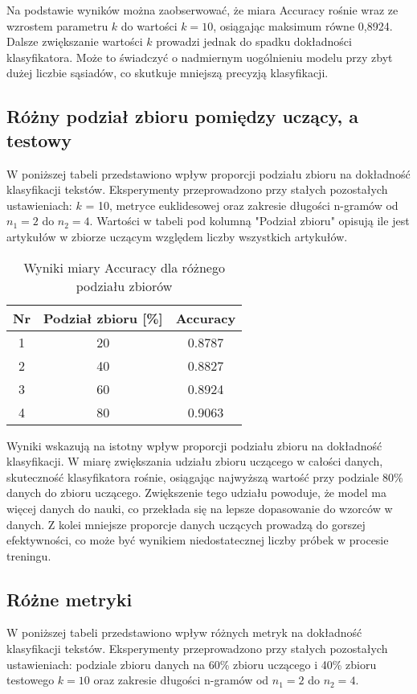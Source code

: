 \documentclass{article}
\begin{document}
Na podstawie wyników można zaobserwować, że miara Accuracy rośnie wraz ze wzrostem parametru \(k\) do wartości \(k = 10\), osiągając maksimum równe 0{,}8924. Dalsze zwiększanie wartości \(k\) prowadzi jednak do spadku dokładności klasyfikatora. Może to świadczyć o nadmiernym uogólnieniu modelu przy zbyt dużej liczbie sąsiadów, co skutkuje mniejszą precyzją klasyfikacji.

\subsection{Różny podział zbioru pomiędzy uczący, a testowy}
W poniższej tabeli przedstawiono wpływ proporcji podziału zbioru na dokładność klasyfikacji tekstów. Eksperymenty przeprowadzono przy stałych pozostałych ustawieniach: \(k\) = 10, metryce euklidesowej oraz zakresie długości n-gramów od \(n_1 = 2\) do \(n_2 = 4\). Wartości w tabeli pod kolumną "Podział zbioru" opisują ile jest artykułów w zbiorze uczącym względem liczby wszystkich artykułów.

\begin{table}[h!]
    \centering
    \begin{tabular}{|c|c|c|}
    \hline
    \textbf{Nr} & \textbf{Podział zbioru [\%]} & \textbf{Accuracy} \\ \hline
    1 & 20 & 0.8787\\ \hline
    2 & 40 & 0.8827 \\ \hline
    3 & 60 & 0.8924 \\ \hline
    4 & 80 & 0.9063 \\ \hline 
    \end{tabular}
    \caption{Wyniki miary Accuracy dla różnego podziału zbiorów}
\end{table}

Wyniki wskazują na istotny wpływ proporcji podziału zbioru na dokładność klasyfikacji. W miarę zwiększania udziału zbioru uczącego w całości danych, skuteczność klasyfikatora rośnie, osiągając najwyższą wartość przy podziale 80\% danych do zbioru uczącego. Zwiększenie tego udziału powoduje, że model ma więcej danych do nauki, co przekłada się na lepsze dopasowanie do wzorców w danych. Z kolei mniejsze proporcje danych uczących prowadzą do gorszej efektywności, co może być wynikiem niedostatecznej liczby próbek w procesie treningu.

\subsection{Różne metryki}
W poniższej tabeli przedstawiono wpływ różnych metryk na dokładność klasyfikacji tekstów. Eksperymenty przeprowadzono przy stałych pozostałych ustawieniach: podziale zbioru danych na 60\% zbioru uczącego i 40\% zbioru testowego \(k = 10\) oraz zakresie długości n-gramów od \(n_1 = 2\) do \(n_2 = 4\). \\
\end{document}
